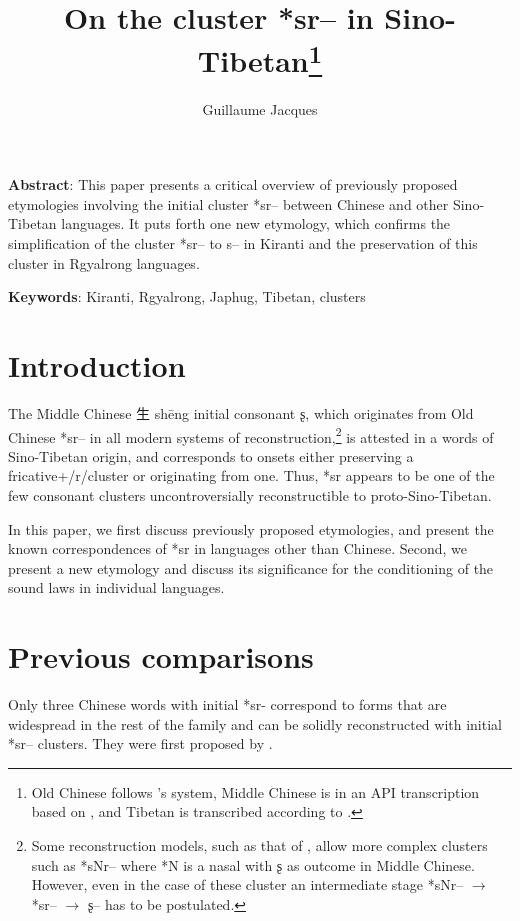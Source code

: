 \documentclass[oldfontcommands,oneside,a4paper,11pt]{article}
\newcommand{\ipa}[1]{{\phon #1}} %
\newcommand{\zh}[1]{{\cn #1}}
\begin{document}
 


\title{On the cluster *sr-- in Sino-Tibetan\footnote{Old Chinese follows \citealt{bs14oc}'s system, Middle Chinese is in an API transcription based on \citet{baxter92}, and Tibetan is transcribed according to \citet{jacques12transcription}.} %
}
\author{Guillaume Jacques}
\maketitle


\textbf{Abstract}: This paper presents a critical overview of previously proposed etymologies involving the initial cluster *\ipa{sr--} between Chinese and other Sino-Tibetan languages. It puts forth one new etymology, which confirms the simplification of the cluster *\ipa{sr--} to \ipa{s--} in Kiranti and the preservation of this cluster in Rgyalrong languages.


\textbf{Keywords}: Kiranti, Rgyalrong, Japhug, Tibetan, clusters


\section{Introduction}

The Middle Chinese \zh{生} shēng initial consonant \ipa{ʂ}, which originates from Old Chinese *\ipa{sr--} in all modern systems of reconstruction,\footnote{Some reconstruction models, such as that of \citet{bs14oc}, allow more complex clusters such as *\ipa{sNr--} where *N is a nasal with \ipa{ʂ} as outcome in Middle Chinese. However, even in the case of these cluster an intermediate stage *\ipa{sNr--} $\rightarrow$ *\ipa{sr--} $\rightarrow$  \ipa{ʂ--} has to be postulated.} is attested in a words of Sino-Tibetan origin, and corresponds to onsets either preserving a fricative+/r/cluster or originating from one. Thus, *\ipa{sr} appears to be  one of the few consonant clusters uncontroversially reconstructible to proto-Sino-Tibetan. 

In this paper, we first discuss previously proposed etymologies, and present the known correspondences of *\ipa{sr} in languages other than Chinese. Second, we present a new etymology and discuss its significance for the conditioning of the sound laws in individual languages.

\section{Previous comparisons} \label{sec:previous}
Only three Chinese words with initial *\ipa{sr-} correspond to forms that are widespread in the rest of the family and can be solidly reconstructed with initial *\ipa{sr--} clusters.  They were first proposed by \citet{benedict72}.
\end{document}
